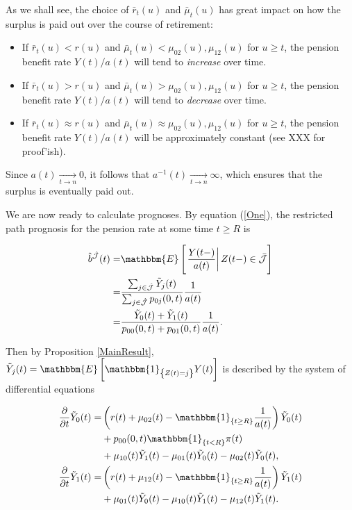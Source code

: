 \documentclass{article}
\newcommand{\1}[1]{\mathbbm{1}_{\left\lbrace #1 \right\rbrace}}
\newcommand{\expec}[1][def]{\mathbbm{E} \left[ #1 \right]}
\newcommand{\econd}[2][def]{\mathbbm{E} \left[ \left. #1 \right| #2 \right]}
\theoremstyle{break}
\theoremstyle{remark}
\newenvironment{remark}
  {\pushQED{\qed}\renewcommand{\qedsymbol}{\scalebox{1.4}{$\circ$}}\remarkx}
  {\popQED\endremarkx}
\numberwithin{equation}{section}
\begin{document}
\begin{remark}
	As we shall see, the choice of $\bar{r}_t(u)$ and $\bar{\mu}_t(u)$ has great impact on how the surplus is paid out over the course of retirement:

\begin{itemize}
	\item If $\bar{r}_t(u)<r(u)$ and $\bar{\mu}_t(u)<\mu_{02}(u),\mu_{12}(u)$ for $u \geq t$, the pension benefit rate $Y(t)/a(t)$ will tend to \textit{increase} over time.
	\item If $\bar{r}_t(u)>r(u)$ and $\bar{\mu}_t(u)>\mu_{02}(u),\mu_{12}(u)$ for $u \geq t$, the pension benefit rate $Y(t)/a(t)$ will tend to \textit{decrease} over time.
	\item If $\bar{r}_t(u)\approx r(u)$ and $\bar{\mu}_t(u)\approx \mu_{02}(u),\mu_{12}(u)$ for $u \geq t$, the pension benefit rate $Y(t)/a(t)$ will be approximately constant (see XXX for proof'ish).
\end{itemize}

Since $a(t) \underset{t \to n}{\longrightarrow} 0$, it follows that $a^{-1}(t) \underset{t \to n}{\longrightarrow} \infty$, which ensures that the surplus is eventually paid out.
\end{remark}

We are now ready to calculate prognoses. By equation (\ref{One}), the restricted path prognosis for the pension rate at some time $t \geq R$ is

\begin{align} \label{Naja}
\begin{split}
		\hat{b}^{\hat{\mathcal{J}}}(t) =& \econd[\frac{Y(t-)}{a(t)}]{Z(t-) \in \bar{\mathcal{J}}} \\
	=&\frac{\sum_{j \in \hat{\mathcal{J}}} \tilde{Y}_j(t)}{\sum_{j \in \hat{\mathcal{J}}} p_{0j}(0,t)} \frac{1}{a(t)} \\
	=&\frac{\tilde{Y}_0(t) + \tilde{Y}_1(t)}{p_{00}(0,t) + p_{01}(0,t)} \frac{1}{a(t)}.
\end{split}
\end{align}

Then by Proposition \ref{MainResult}, $\tilde{Y}_j(t) = \expec[\1{Z(t)=j} Y(t)]$ is described by the system of differential equations

\begin{align} \label{Jaja}
\begin{split}
	\frac{\partial}{\partial t} \tilde{Y}_0(t) =& \left( r(t) + \mu_{02}(t) - \1{t \geq R} \frac{1}{a(t)}\right) \tilde{Y}_0(t) \\
	&+ p_{00}(0,t) \1{t<R} \pi(t) \\
	&+ \mu_{10}(t) \tilde{Y}_1(t) - \mu_{01}(t) \tilde{Y}_0(t) - \mu_{02}(t) \tilde{Y}_0(t), \\
	\frac{\partial}{\partial t} \tilde{Y}_1(t) =& \left( r(t) + \mu_{12}(t) - \1{t \geq R} \frac{1}{a(t)}\right) \tilde{Y}_1(t) \\
	&+ \mu_{01}(t) \tilde{Y}_0(t) - \mu_{10}(t) \tilde{Y}_1(t) - \mu_{12}(t) \tilde{Y}_1(t).
\end{split}
\end{align}
\end{document}
